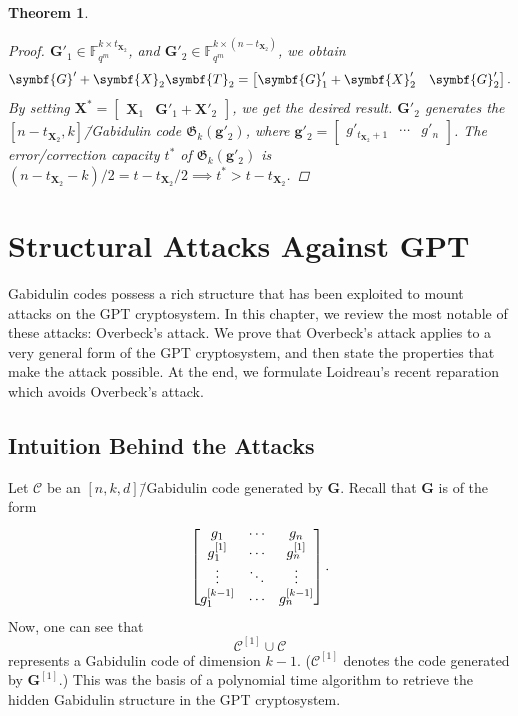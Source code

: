\documentclass[version=last, paper=A4, parskip=half, oneside]{scrbook}
\theoremstyle{plain}
\newtheorem{theorem}{Theorem}
\theoremstyle{definition}
\theoremstyle{remark}
\renewcommand*{\vec}{\symbf}
\newcommand*{\mat}{\symbf}
\newcommand*{\FF}{\ensuremath{\mathbb{F}}}
\newcommand*{\Gab}{\ensuremath{\mathfrak{G}}}
\begin{document}
\begin{theorem}
\begin{proof}
    \(\mat{G}'_1 \in \FF_{q^m}^{k \times t_{\mat{X}_2}}\), and
    \(\mat{G}'_2 \in \FF_{q^m}^{k \times (n - t_{\mat{X}_2})}\), we obtain
    \[
      \mat{G}' + \mat{X}_2 \mat{T}_2 = \begin{bmatrix} \mat{G}'_1 + \mat{X}'_2 & \mat{G}'_2 \end{bmatrix}\text.
    \]
    By setting
    \(\mat{X}^* = \begin{bmatrix} \mat{X}_1 & \mat{G}'_1 + \mat{X}'_2 \end{bmatrix}\),
    we get the desired result.  \(\mat{G}'_2\) generates the
    \([n - t_{\mat{X}_2}, k]\)\=/Gabidulin code \(\Gab_k(\vec{g}'_2)\), where
    \(\vec{g}'_2 = \begin{bmatrix} g'_{t_{\mat{X}_2} + 1} & \cdots & g'_n \end{bmatrix}\).
    The error\-/correction capacity \(t^*\) of \(\Gab_k(\vec{g}'_2)\) is
    \((n - t_{\mat{X}_2} - k) / {2} = t - t_{\mat{X}_2} / {2} \implies t^* > t - t_{\mat{X}_2}\).
  \end{proof}
\end{theorem}

\chapter{Structural Attacks Against GPT}\label{chap:structural-attacks}

Gabidulin codes possess a rich structure that has been exploited to mount
attacks on the GPT cryptosystem.  In this chapter, we review the most notable of
these attacks: Overbeck's attack.  We prove that Overbeck's attack applies to a
very general form of the GPT cryptosystem, and then state the properties that
make the attack possible.  At the end, we formulate Loidreau's recent reparation
which avoids Overbeck's attack.

\section{Intuition Behind the Attacks}

Let \(\mathcal{C}\) be an \([n, k, d]\)\=/Gabidulin code generated by
\(\mat{G}\).  Recall that \(\mat{G}\) is of the form
\[
  \begin{bmatrix}
    g_1 & \cdots & g_n \\
    g_1^{[1]} & \cdots & g_n^{[1]} \\
    \vdots & \ddots & \vdots \\
    g_1^{[k - 1]} & \cdots & g_n^{[k - 1]}
  \end{bmatrix}\text.
\]
Now, one can see that
\[
  \mathcal{C}^{[1]} \cup \mathcal{C}
\]
represents a Gabidulin code of dimension \(k - 1\).  (\(\mathcal{C}^{[1]}\)
denotes the code generated by \(\mat{G}^{[1]}\).)  This was the basis of a
polynomial time algorithm to retrieve the hidden Gabidulin structure in the GPT
cryptosystem.
\end{document}
